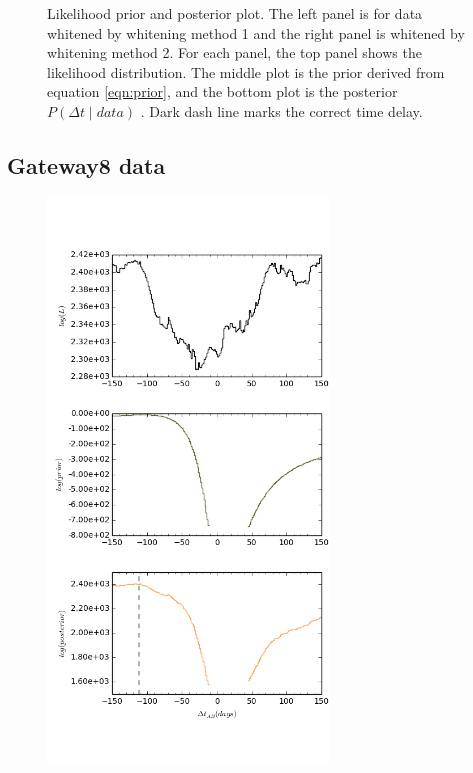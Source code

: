 \documentclass[\docopts]{\docclass}
\begin{document}
\begin{figure}[!h]
\begin{minipage}[bottom]{0.4\textwidth}
  \end{minipage}
 \caption{Likelihood prior and posterior plot. The left panel is for data whitened by whitening method 1 and the right panel is whitened by whitening method 2. For each panel, the top panel shows the likelihood distribution. The middle plot is the prior derived from equation \ref{eqn:prior}, and the bottom plot is the posterior $P(\Delta t \mid data)$ . Dark dash line marks the correct time delay. }
\end{figure}
\newpage

\subsection{Gateway8 data}

\begin{figure}[!h]
  \centering
  \begin{minipage}[bottom]{0.4\textwidth}
\includegraphics[width=\textwidth, height=15cm, keepaspectratio]{whiten1/data8_full_log.png}
  \end{minipage}
  \hfill
  \begin{minipage}[bottom]{0.4\textwidth}

\end{minipage}
\end{figure}
\end{document}
